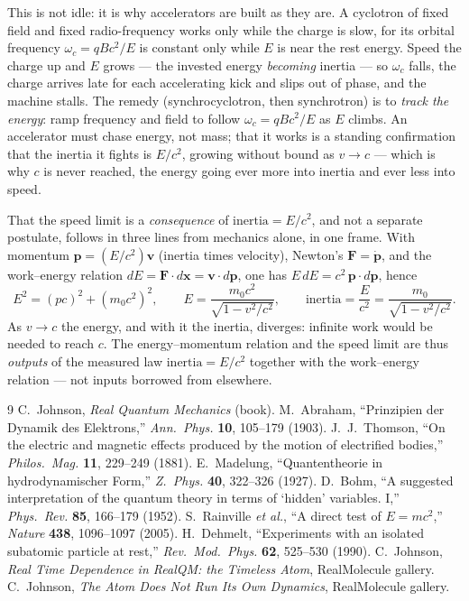 \documentclass[11pt]{article}
\begin{document}
This is not idle: it is why accelerators are built as they are. A cyclotron of fixed field and fixed
radio-frequency works only while the charge is slow, for its orbital frequency $\omega_c=qBc^2/E$ is constant only
while $E$ is near the rest energy. Speed the charge up and $E$ grows --- the invested energy \emph{becoming}
inertia --- so $\omega_c$ falls, the charge arrives late for each accelerating kick and slips out of phase, and the
machine stalls. The remedy (synchrocyclotron, then synchrotron) is to \emph{track the energy}: ramp frequency and
field to follow $\omega_c=qBc^2/E$ as $E$ climbs. An accelerator must chase energy, not mass; that it works is a
standing confirmation that the inertia it fights is $E/c^2$, growing without bound as $v\to c$ --- which is why $c$
is never reached, the energy going ever more into inertia and ever less into speed.

That the speed limit is a \emph{consequence} of $\text{inertia}=E/c^2$, and not a separate postulate, follows in
three lines from mechanics alone, in one frame. With momentum $\mathbf p=(E/c^2)\mathbf v$ (inertia times
velocity), Newton's $\mathbf F=\dot{\mathbf p}$, and the work--energy relation
$dE=\mathbf F\!\cdot\!d\mathbf x=\mathbf v\!\cdot\!d\mathbf p$, one has $E\,dE=c^2\,\mathbf p\!\cdot\!d\mathbf p$,
hence
\begin{equation}
E^2=(pc)^2+(m_0 c^2)^2,\qquad
E=\frac{m_0 c^2}{\sqrt{1-v^2/c^2}},\qquad
\text{inertia}=\frac{E}{c^2}=\frac{m_0}{\sqrt{1-v^2/c^2}} .
\end{equation}
As $v\to c$ the energy, and with it the inertia, diverges: infinite work would be needed to reach $c$. The
energy--momentum relation and the speed limit are thus \emph{outputs} of the measured law $\text{inertia}=E/c^2$
together with the work--energy relation --- not inputs borrowed from elsewhere.

\begin{thebibliography}{9}
 C.~Johnson, \emph{Real Quantum Mechanics} (book).
 M.~Abraham, ``Prinzipien der Dynamik des Elektrons,''
  \emph{Ann.\ Phys.} \textbf{10}, 105--179 (1903).
 J.~J.~Thomson, ``On the electric and magnetic effects produced by the motion
  of electrified bodies,'' \emph{Philos.\ Mag.} \textbf{11}, 229--249 (1881).
 E.~Madelung, ``Quantentheorie in hydrodynamischer Form,''
  \emph{Z.\ Phys.} \textbf{40}, 322--326 (1927).
 D.~Bohm, ``A suggested interpretation of the quantum theory in terms of
  `hidden' variables. I,'' \emph{Phys.\ Rev.} \textbf{85}, 166--179 (1952).
 S.~Rainville \emph{et al.}, ``A direct test of $E=mc^2$,''
  \emph{Nature} \textbf{438}, 1096--1097 (2005).
 H.~Dehmelt, ``Experiments with an isolated subatomic particle at rest,''
  \emph{Rev.\ Mod.\ Phys.} \textbf{62}, 525--530 (1990).
 C.~Johnson, \emph{Real Time Dependence in RealQM: the Timeless Atom},
  RealMolecule gallery.
 C.~Johnson, \emph{The Atom Does Not Run Its Own Dynamics},
  RealMolecule gallery.
\end{thebibliography}
\end{document}
